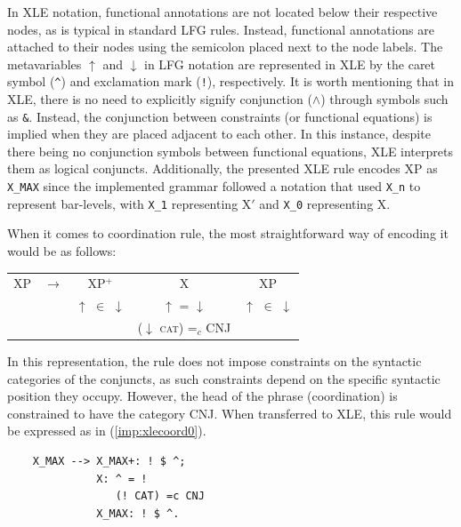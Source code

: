 In XLE notation, functional annotations are not located below their respective nodes, as is typical in standard LFG rules. Instead, functional annotations are attached to their nodes using the semicolon placed next to the node labels. The metavariables $\uparrow$ and $\downarrow$ in LFG notation are represented in XLE by the caret symbol (\texttt{\^}) and exclamation mark (\texttt{!}), respectively. It is worth mentioning that in XLE, there is no need to explicitly signify conjunction ($\land$) through symbols such as \texttt{\&}. Instead, the conjunction between constraints (or functional equations) is implied when they are placed adjacent to each other. In this instance, despite there being no conjunction symbols between functional equations, XLE interprets them as logical conjuncts. Additionally, the presented XLE rule encodes XP as \texttt{X\_MAX} since the implemented grammar followed a notation that used \texttt{X\_n} to represent bar-levels, with \texttt{X\_1} representing X$'$ and \texttt{X\_0} representing X.

When it comes to coordination rule, the most straightforward way of encoding it would be as follows: 

\pex
\vspace{-12pt}
\label{imp:coordrule0}

\begin{tabular}{lcccc}
	XP & $\longrightarrow$ & XP$^{+}$ & X & XP \\
	& & $\uparrow$ $\in$ $\downarrow$ & $\uparrow$ = $\downarrow$ & $\uparrow$ $\in$ $\downarrow$ \\
	& & & ($\downarrow$ \textsc{cat}) =$_c$ CNJ & 
\end{tabular}
\xe

In this representation, the rule does not impose constraints on the syntactic categories of the conjuncts, as such constraints depend on the specific syntactic position they occupy. However, the head of the phrase (coordination) is constrained to have the category CNJ. When transferred to XLE, this rule would be expressed as in (\ref{imp:xlecoord0}).

\newpage
\pex
\label{imp:xlecoord0}
\vspace{-19pt}

\begin{lstlisting}
	X_MAX --> X_MAX+: ! $ ^;
	          X: ^ = !
	             (! CAT) =c CNJ
	          X_MAX: ! $ ^.
\end{lstlisting}
\xe

